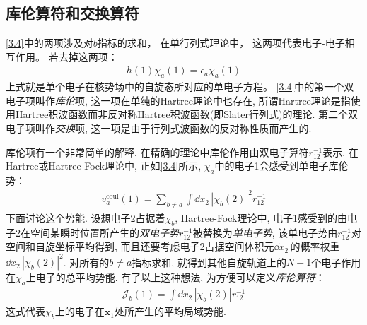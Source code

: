 \subsection{库伦算符和交换算符}
\autoref{3.4}中的两项涉及对$b$指标的求和，
在单行列式理论中，
这两项代表电子-电子相互作用。
若去掉这两项：
\begin{align}
	h(1)\chi_a(1) = \epsilon_a\chi_a(1)
\end{align}
上式就是单个电子在核势场中的自旋态所对应的单电子\sch 方程。 
\autoref{3.4}中的第一个双电子项叫作\emph{库伦}项, 
这一项在单纯的Hartree理论中也存在, 
所谓Hartree理论是指使用Hartree积波函数而非反对称Hartree积波函数(即Slater行列式)的理论. 
第二个双电子项叫作\emph{交换}项, 
这一项是由于行列式波函数的反对称性质而产生的.


库伦项有一个非常简单的解释. 
在精确的理论中库伦作用由双电子算符$r_{12}^{-1}$表示. 
在Hartree或Hartree-Fock理论中, 
正如\autoref{3.4}所示, 
$\chi_a$中的电子1会感受到单电子库伦势：
\begin{align}
	v_a^\mathrm{coul}(1) = \sum_{b\neq a} \int\dd{x}_2\,|\chi_b(2)|^2 r_{12}^{-1}
\end{align}
下面讨论这个势能. 
设想电子$2$占据着$\chi_b$, 
Hartree-Fock理论中, 
电子1感受到的由电子2在空间某瞬时位置所产生的\emph{双电子势$r_{12}^{-1}$}被替换为\emph{单电子势}, 
该单电子势由$r_{12}^{-1}$对空间和自旋坐标平均得到, 
而且还要考虑电子2占据空间体积元$\dd{x}_2\,$的概率权重$\dd{x}_2\,|\chi_b(2)|^2$. 
对所有的$b\neq a$指标求和, 
就得到其他自旋轨道上的$N-1$个电子作用在$\chi_a$上电子的总平均势能. 
有了以上这种想法, 
为方便可以定义\emph{库伦算符}：
\begin{align}
	\mathscr{J}_b(1) = \int\dd{x}_2\,|\chi_b(2)|r_{12}^{-1}
\end{align}
这式代表$\chi_b$上的电子在$\mathbf{x}_1$处所产生的平均局域势能.


